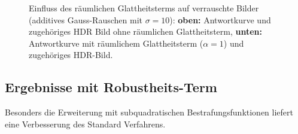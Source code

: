 \begin{figure}
  \begin{center}
    
    \caption{Einfluss des räumlichen Glattheitsterms auf verrauschte Bilder (additives Gauss-Rauschen mit $\sigma = 10$): \textbf{oben:} Antwortkurve und zugehöriges HDR Bild ohne räumlichen Glattheitsterm, \textbf{unten:} Antwortkurve mit räumlichem Glattheitsterm ($\alpha = 1$) und zugehöriges HDR-Bild.}
    \label{fig:raum:1}
  \end{center}
\end{figure}

\subsection{Ergebnisse mit Robustheits-Term}

Besonders die Erweiterung mit subquadratischen Bestrafungsfunktionen liefert eine Verbesserung des Standard Verfahrens. 


